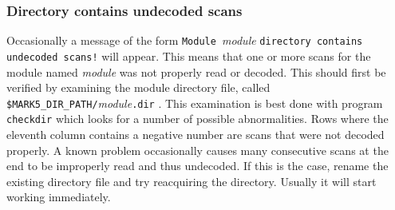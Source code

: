 %
%
%
%

\subsubsection{Directory contains undecoded scans}

Occasionally a message of the form {\tt Module }{\em module} {\tt directory contains undecoded scans!} will appear.
This means that one or more scans for the module named {\em module} was not properly read or decoded.
This should first be verified by examining the module directory file, called {\tt \$MARK5\_DIR\_PATH/}{\em module}{\tt .dir} .
This examination is best done with program {\tt checkdir} which looks for a number of possible abnormalities.
Rows where the eleventh column contains a negative number are scans that were not decoded properly.
A known problem occasionally causes many consecutive scans at the end to be improperly read and thus undecoded.  
If this is the case, rename the existing directory file and try reacquiring the directory.
Usually it will start working immediately.

